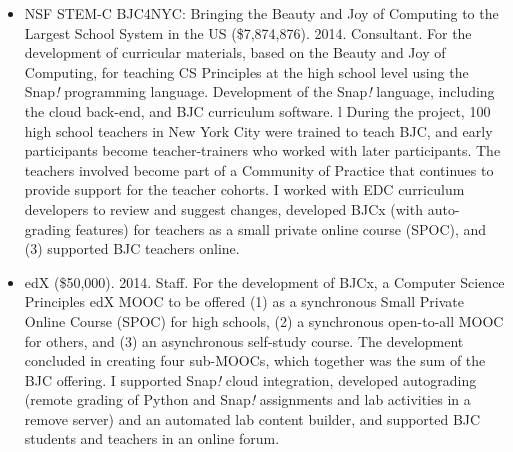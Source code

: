 \begin{itemize}
    \item{NSF STEM-C BJC4NYC: Bringing the Beauty and Joy of Computing to the Largest School System in the US (\$7,874,876). 2014. Consultant.}
    \newline\small{For the development of curricular materials, based on the Beauty and Joy of Computing, for teaching CS Principles at the high school level using the Snap\textit{!} programming language. Development of the Snap\textit{!} language, including the cloud back-end, and BJC curriculum software. l During the project, 100 high school teachers in New York City were trained to teach BJC, and early participants become teacher-trainers who worked with later participants. The teachers involved become part of a Community of Practice that continues to provide support for the teacher cohorts. I worked with EDC curriculum developers to review and suggest changes, developed BJCx (with auto-grading features) for teachers as a small private online course (SPOC), and (3) supported BJC teachers online.}
    
    \item{edX (\$50,000). 2014. Staff.}
    \newline\small{For the development of BJCx, a Computer Science Principles edX MOOC to be offered (1) as a synchronous Small Private Online Course (SPOC) for high schools, (2) a synchronous open-to-all MOOC for others, and (3) an asynchronous self-study course. The development concluded in creating four sub-MOOCs, which together was the sum of the BJC offering. I supported Snap\textit{!} cloud integration, developed autograding (remote grading of Python and Snap\textit{!} assignments and lab activities in a remove server) and an automated lab content builder, and supported BJC students and teachers in an online forum.}

\end{itemize}
